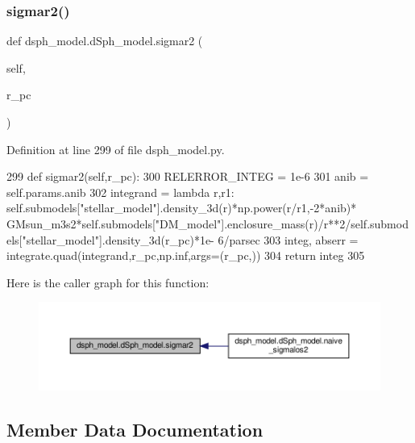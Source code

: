 \subsubsection{\texorpdfstring{sigmar2()}{sigmar2()}}
{\footnotesize\ttfamily def dsph\+\_\+model.\+d\+Sph\+\_\+model.\+sigmar2 (\begin{DoxyParamCaption}\item[{}]{self,  }\item[{}]{r\+\_\+pc }\end{DoxyParamCaption})}



Definition at line 299 of file dsph\+\_\+model.\+py.


\begin{DoxyCode}
299     \textcolor{keyword}{def }sigmar2(self,r\_pc):
300         RELERROR\_INTEG = 1e-6
301         anib = self.params.anib
302         integrand = \textcolor{keyword}{lambda} r,r1: self.submodels[\textcolor{stringliteral}{"stellar\_model"}].density\_3d(r)*np.power(r/r1,-2*anib)*
      GMsun\_m3s2*self.submodels[\textcolor{stringliteral}{"DM\_model"}].enclosure\_mass(r)/r**2/self.submodels[\textcolor{stringliteral}{"stellar\_model"}].density\_3d(r\_pc)*1e-
      6/parsec
303         integ, abserr = integrate.quad(integrand,r\_pc,np.inf,args=(r\_pc,))
304         \textcolor{keywordflow}{return} integ
305     
\end{DoxyCode}
Here is the caller graph for this function\+:\nopagebreak
\begin{figure}[H]
\begin{center}
\leavevmode
\includegraphics[width=350pt]{d0/d25/classdsph__model_1_1dSph__model_a1c6185c02a3f58951b7ed9b75a348f49_icgraph}
\end{center}
\end{figure}


\subsection{Member Data Documentation}
\mbox{\label{classdsph__model_1_1dSph__model_a44e4805fa7304536056b19bd361c3d37}} 
